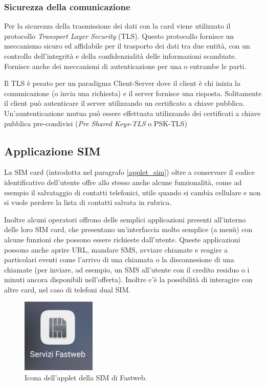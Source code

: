 \subsubsection{Sicurezza della comunicazione}
\label{tls}
Per la sicurezza della trasmissione dei dati con la card viene utilizzato il protocollo \textit{Transport Layer Security}  (TLS). Questo protocollo fornisce un meccanismo sicuro ed affidabile per il trasporto dei dati tra due entità, con un controllo dell'integrità e della confidenzialità delle informazioni scambiate. Fornisce anche dei meccanismi di autenticazione per una o entrambe le parti.

Il TLS è pesato per un paradigma Client-Server dove il client è chi inizia la comunicazione (o invia una richiesta) e il server fornisce una risposta. Solitamente il client può autenticare il server utilizzando un certificato a chiave pubblica. Un'auntenticazione mutua può essere effettuata utilizzando dei certificati a chiave pubblica pre-condivisi (\textit{Pre Shared Keys-TLS} o PSK-TLS)
\cite{scwebserver}

\subsection{Applicazione SIM}
\label{appsim}
La SIM card (introdotta nel paragrafo \ref{applet_sim}) oltre a conservare il codice identificativo dell'utente offre allo stesso anche alcune funzionalità, come ad esempio il salvataggio di contatti telefonici, utile quando si cambia cellulare e non si vuole perdere la lista di contatti salvata in rubrica.

Inoltre alcuni operatori offrono delle semplici applicazioni presenti all'interno delle loro SIM card, che presentano un'interfaccia molto semplice (a menù) con alcune funzioni che possono essere richieste dall'utente. Queste applicazioni possono anche aprire URL, mandare SMS, avviare chiamate e reagire a particolari eventi come l'arrivo di una chiamata o la disconnesione di una chiamate (per inviare, ad esempio, un SMS all'utente con il credito residuo o i minuti ancora disponibili nell'offerta). Inoltre c'è la possibilità di interagire con altre card, nel caso di telefoni dual SIM.

\begin{figure}[h!]
  \centering
  \includegraphics[width=100pt]{pictures/icona_aplet_fastweb.jpg}
  \caption{Icona dell'applet della SIM di Fastweb.}
  \label{fig:app_icon}
\end{figure}

